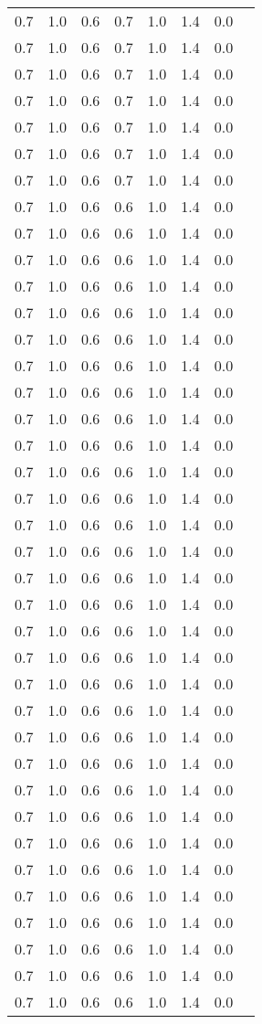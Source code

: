 \begin{tabular}{L{1in}|L{1in}|L{1in}|L{1in}|L{1in}|L{1in}|L{1in}|L{1in}}
0.7&1.0&0.6&0.7&1.0&1.4&0.0\\
0.7&1.0&0.6&0.7&1.0&1.4&0.0\\
0.7&1.0&0.6&0.7&1.0&1.4&0.0\\
0.7&1.0&0.6&0.7&1.0&1.4&0.0\\
0.7&1.0&0.6&0.7&1.0&1.4&0.0\\
0.7&1.0&0.6&0.7&1.0&1.4&0.0\\
0.7&1.0&0.6&0.7&1.0&1.4&0.0\\
0.7&1.0&0.6&0.6&1.0&1.4&0.0\\
0.7&1.0&0.6&0.6&1.0&1.4&0.0\\
0.7&1.0&0.6&0.6&1.0&1.4&0.0\\
0.7&1.0&0.6&0.6&1.0&1.4&0.0\\
0.7&1.0&0.6&0.6&1.0&1.4&0.0\\
0.7&1.0&0.6&0.6&1.0&1.4&0.0\\
0.7&1.0&0.6&0.6&1.0&1.4&0.0\\
0.7&1.0&0.6&0.6&1.0&1.4&0.0\\
0.7&1.0&0.6&0.6&1.0&1.4&0.0\\
0.7&1.0&0.6&0.6&1.0&1.4&0.0\\
0.7&1.0&0.6&0.6&1.0&1.4&0.0\\
0.7&1.0&0.6&0.6&1.0&1.4&0.0\\
0.7&1.0&0.6&0.6&1.0&1.4&0.0\\
0.7&1.0&0.6&0.6&1.0&1.4&0.0\\
0.7&1.0&0.6&0.6&1.0&1.4&0.0\\
0.7&1.0&0.6&0.6&1.0&1.4&0.0\\
0.7&1.0&0.6&0.6&1.0&1.4&0.0\\
0.7&1.0&0.6&0.6&1.0&1.4&0.0\\
0.7&1.0&0.6&0.6&1.0&1.4&0.0\\
0.7&1.0&0.6&0.6&1.0&1.4&0.0\\
0.7&1.0&0.6&0.6&1.0&1.4&0.0\\
0.7&1.0&0.6&0.6&1.0&1.4&0.0\\
0.7&1.0&0.6&0.6&1.0&1.4&0.0\\
0.7&1.0&0.6&0.6&1.0&1.4&0.0\\
0.7&1.0&0.6&0.6&1.0&1.4&0.0\\
0.7&1.0&0.6&0.6&1.0&1.4&0.0\\
0.7&1.0&0.6&0.6&1.0&1.4&0.0\\
0.7&1.0&0.6&0.6&1.0&1.4&0.0\\
0.7&1.0&0.6&0.6&1.0&1.4&0.0\\
0.7&1.0&0.6&0.6&1.0&1.4&0.0\\
0.7&1.0&0.6&0.6&1.0&1.4&0.0\\

\end{tabular}
